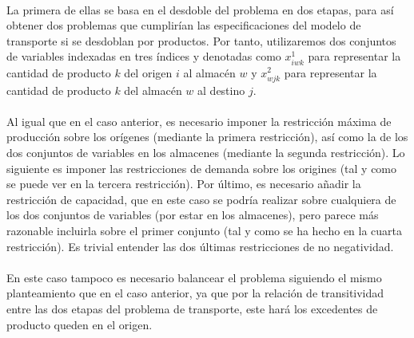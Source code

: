 \documentclass{article}
\begin{document}
    \paragraph{}
    La primera de ellas se basa en el desdoble del problema en dos etapas, para así obtener dos problemas que cumplirían las especificaciones del modelo de transporte si se desdoblan por productos. Por tanto, utilizaremos dos conjuntos de variables indexadas en tres índices y denotadas como $x^{1}_{iwk}$ para representar la cantidad de producto $k$ del origen $i$ al almacén $w$ y $x^{2}_{wjk}$ para representar la cantidad de producto $k$ del almacén $w$ al destino $j$.

    \paragraph{}
    Al igual que en el caso anterior, es necesario imponer la restricción máxima de producción sobre los orígenes (mediante la primera restricción), así como la  de los dos conjuntos de variables en los almacenes (mediante la segunda restricción). Lo siguiente es imponer las restricciones de demanda sobre los origines (tal y como se puede ver en la tercera restricción). Por último, es necesario añadir la restricción de capacidad, que en este caso se podría realizar sobre cualquiera de los dos conjuntos de variables (por estar en los almacenes), pero parece más razonable incluirla sobre el primer conjunto (tal y como se ha hecho en la cuarta restricción). Es trivial entender las dos últimas restricciones de no negatividad.

    \paragraph{}
    En este caso tampoco es necesario balancear el problema siguiendo el mismo planteamiento que en el caso anterior, ya que por la relación de transitividad entre las dos etapas del problema de transporte, este hará los excedentes de producto queden en el origen.
\end{document}

